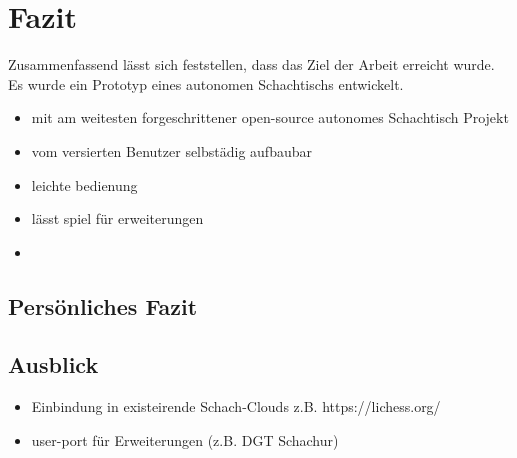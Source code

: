 \hypertarget{fazit}{%
\chapter{Fazit}\label{fazit}}

Zusammenfassend lässt sich feststellen, dass das Ziel der Arbeit
erreicht wurde. Es wurde ein Prototyp eines autonomen Schachtischs
entwickelt.

\begin{itemize}
\item
  mit am weitesten forgeschrittener open-source autonomes Schachtisch
  Projekt
\item
  vom versierten Benutzer selbstädig aufbaubar
\item
  leichte bedienung
\item
  lässt spiel für erweiterungen
\item
\end{itemize}

\hypertarget{persuxf6nliches-fazit}{%
\section{Persönliches Fazit}\label{persuxf6nliches-fazit}}

\hypertarget{ausblick}{%
\section{Ausblick}\label{ausblick}}

\begin{itemize}
\tightlist
\item
  Einbindung in existeirende Schach-Clouds z.B. https://lichess.org/
\item
  user-port für Erweiterungen (z.B. DGT Schachur)
\end{itemize}



